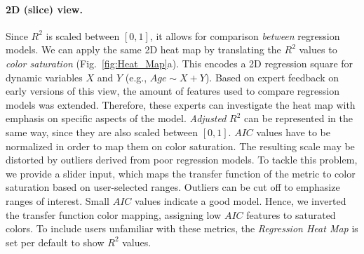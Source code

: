 \documentclass[journal]{style/vgtc} 			          %
\begin{document}
\paragraph{2D (slice) view.}
Since $R^2$ is scaled between $[0, 1]$, it allows for comparison \emph{between} regression models.
We can apply the same 2D heat map by translating the $R^2$ values to \emph{color saturation} (Fig.~\ref{fig:Heat_Map}a).
This encodes a 2D regression square for dynamic variables $X$ and $Y$ (e.g., $Age \sim X + Y$).
Based on expert feedback on early versions of this view, the amount of features used to compare regression models was extended.
Therefore, these experts can investigate the heat map with emphasis on specific aspects of the model.
\emph{Adjusted} $R^2$ can be represented in the same way, since they are also scaled between $[0, 1]$.
$AIC$ values have to be normalized in order to map them on color saturation.
The resulting scale may be distorted by outliers derived from poor regression models.
To tackle this problem, we provide a slider input, which maps the transfer function of the metric to color saturation based on user-selected ranges.
Outliers can be cut off to emphasize ranges of interest.
Small $AIC$ values indicate a good model.
Hence, we inverted the transfer function color mapping, assigning low $AIC$ features to saturated colors.
To include users unfamiliar with these metrics, the \emph{Regression Heat Map} is set per default to show $R^2$ values.
\end{document}
